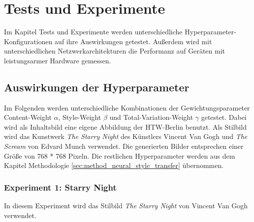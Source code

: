 \chapter{Tests und Experimente}
\label{cha:tests}

Im Kapitel Tests und Experimente werden unterschiedliche Hyperparameter-Konfigurationen auf ihre Auswirkungen getestet. Außerdem wird mit unterschiedlichen Netzwerkarchitekturen die Performanz auf Geräten mit leistungsarmer Hardware gemessen.

\section{Auswirkungen der Hyperparameter}

Im Folgenden werden unterschiedliche Kombinationen der Gewichtungsparameter Content-Weight $ \alpha $, Style-Weight $ \beta $ und Total-Variation-Weight $ \gamma $ getestet. Dabei wird als Inhaltsbild  eine eigene Abbildung der HTW-Berlin benutzt. Als Stilbild wird das Kunstwerk \textit{The Starry Night} des Künstlers Vincent Van Gogh und \textit{The Scream} von Edvard Munch verwendet. Die generierten Bilder entsprechen einer Größe von 768 * 768 Pixeln. Die restlichen Hyperparameter werden aus dem Kapitel Methodologie \ref{sec:method_neural_style_transfer} übernommen.

\pagebreak

\subsection{Experiment 1: Starry Night}
\let\thefootnote\relax{}


In diesem Experiment wird das Stilbild \textit{The Starry Night} von Vincent Van Gogh verwendet.


